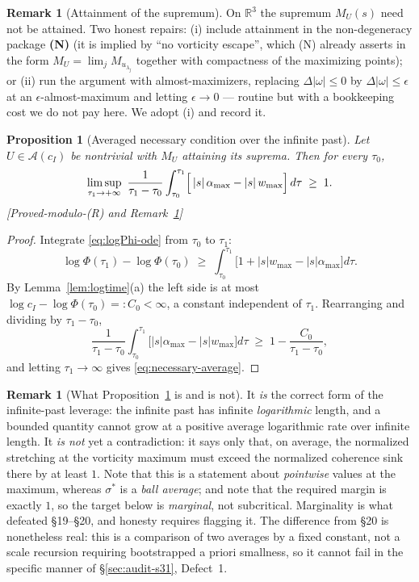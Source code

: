 \documentclass[11pt]{article}
\newtheorem{proposition}[theorem]{Proposition}
\theoremstyle{definition}
\newtheorem{remark}[theorem]{Remark}
\theoremstyle{remark}
\newcommand{\R}{\mathbb{R}}
\begin{document}
\begin{remark}[Attainment of the supremum]\label{rem:attainment}
  On $\R^3$ the supremum $M_U(s)$ need not be attained. Two honest
  repairs: (i) include attainment in the non-degeneracy package
  \textbf{(N)} (it is implied by ``no vorticity escape'', which (N) already
  asserts in the form $M_U=\lim_jM_{u_{\lambda_j}}$ together with
  compactness of the maximizing points); or (ii) run the argument with
  almost-maximizers, replacing $\Delta|\omega|\leq0$ by
  $\Delta|\omega|\leq\epsilon$ at an $\epsilon$-almost-maximum and letting
  $\epsilon\to0$ --- routine but with a bookkeeping cost we do not pay here.
  We adopt (i) and record it.
\end{remark}

\begin{proposition}[Averaged necessary condition over the infinite past]
  \label{prop:logtime-necessary}
  Let $U\in\mathcal{A}(c_I)$ be nontrivial with $M_U$ attaining its suprema.
  Then for every $\tau_0$,
  \begin{equation}\label{eq:necessary-average}
    \limsup_{\tau_1\to+\infty}\ \frac{1}{\tau_1-\tau_0}
    \int_{\tau_0}^{\tau_1}\Bigl[\,|s|\,\alpha_{\max} - |s|\,w_{\max}\Bigr]\,d\tau
    \;\geq\; 1 .
  \end{equation}
  \emph{[Proved-modulo-(R) and Remark~\ref{rem:attainment}]}
\end{proposition}
\begin{proof}
  Integrate \eqref{eq:logPhi-ode} from $\tau_0$ to $\tau_1$:
  \[
    \log\Phi(\tau_1)-\log\Phi(\tau_0)
    \;\geq\; \int_{\tau_0}^{\tau_1}\bigl[1+|s|w_{\max}-|s|\alpha_{\max}\bigr]d\tau .
  \]
  By Lemma~\ref{lem:logtime}(a) the left side is at most
  $\log c_I-\log\Phi(\tau_0)=:C_0<\infty$, a constant independent of
  $\tau_1$. Rearranging and dividing by $\tau_1-\tau_0$,
  \[
    \frac{1}{\tau_1-\tau_0}\int_{\tau_0}^{\tau_1}
      \bigl[|s|\alpha_{\max}-|s|w_{\max}\bigr]d\tau
    \;\geq\; 1 - \frac{C_0}{\tau_1-\tau_0},
  \]
  and letting $\tau_1\to\infty$ gives \eqref{eq:necessary-average}.
\end{proof}

\begin{remark}[What Proposition~\ref{prop:logtime-necessary} is and is not]
  It \emph{is} the correct form of the infinite-past leverage: the infinite
  past has infinite \emph{logarithmic} length, and a bounded quantity cannot
  grow at a positive average logarithmic rate over infinite length. It
  \emph{is not} yet a contradiction: it says only that, on average, the
  normalized stretching at the vorticity maximum must exceed the normalized
  coherence sink there by at least $1$. Note that this is a statement about
  \emph{pointwise} values at the maximum, whereas $\sigma^*$ is a
  \emph{ball average}; and note that the required margin is exactly $1$, so
  the target below is \emph{marginal}, not subcritical. Marginality is what
  defeated \S19--\S20, and honesty requires flagging it. The difference from
  \S20 is nonetheless real: this is a comparison of two averages by a fixed
  constant, not a scale recursion requiring bootstrapped a priori smallness,
  so it cannot fail in the specific manner of \S\ref{sec:audit-s31},
  Defect~1.
\end{remark}
\end{document}
